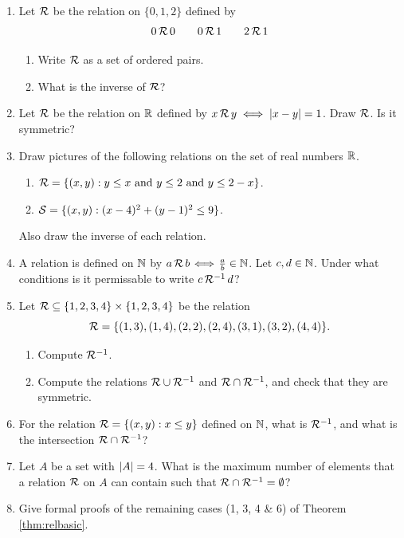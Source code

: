 \begin{exercises}{}{}
\begin{enumerate}
  \item Let $\mathcal{R}$ be the relation on $\{0,1,2\}$ defined by
  \[0\,\mathcal{R}\,0\qquad 0\,\mathcal{R}\,1\qquad 2\,\mathcal{R}\,1\]
  \begin{enumerate}
    \item Write $\mathcal{R}$ as a set of ordered pairs.
    \item What is the inverse of $\mathcal{R}$?
	\end{enumerate}
	
	\item Let $\mathcal{R}$ be the relation on $\mathbb{R}$ defined by $x\,\mathcal{R}\,y\iff\left| x-y\right|=1$. Draw $\mathcal{R}$. Is it symmetric?
  
	\item Draw pictures of the following relations on the set of real numbers $\mathbb{R}$.
		\begin{enumerate}
			\item $\mathcal{R}=\{(x,y):y\le x\text{ and }y\le 2\text{ and }y\le 2-x\}$.
			\item $\mathcal{S}=\{(x,y):(x-4)^2+(y-1)^2\le 9\}$.
		\end{enumerate}
	Also draw the inverse of each relation.
	
	\item A relation is defined on $\mathbb{N}$ by $a\,\mathcal{R}\,b\!\iff\! \frac ab\in\mathbb{N}$. Let $c,d\in\mathbb{N}$. Under what conditions is it permissable to write $c\,\mathcal{R}^{-1}\,d$?
	
	\item Let $\mathcal{R}\subseteq\{1,2,3,4\}\times\{1,2,3,4\}$ be the relation
	\[\mathcal{R}=\{(1,3),(1,4),(2,2),(2,4),(3,1),(3,2),(4,4)\}.\]
	\begin{enumerate}
	  \item Compute $\mathcal{R}^{-1}$.
	  \item Compute the relations $\mathcal{R}\cup \mathcal{R}^{-1}$ and $\mathcal{R}\cap \mathcal{R}^{-1}$, and check that they are symmetric.
	\end{enumerate}
  
  \item For the relation $\mathcal{R}=\{(x,y):x\le y\}$ defined on $\mathbb{N}$, what is $\mathcal{R}^{-1}$, and what is the intersection $\mathcal{R}\cap\mathcal{R}^{-1}$?

  \item Let $A$ be a set with $\left| A\right|=4$. What is the maximum number of elements that a relation $\mathcal{R}$ on $A$ can contain such that $\mathcal{R}\cap \mathcal{R}^{-1}=\emptyset$?
  
  \item Give formal proofs of the remaining cases (1, 3, 4 \& 6) of Theorem \ref{thm:relbasic}.
  

\end{enumerate}
\end{exercises}
